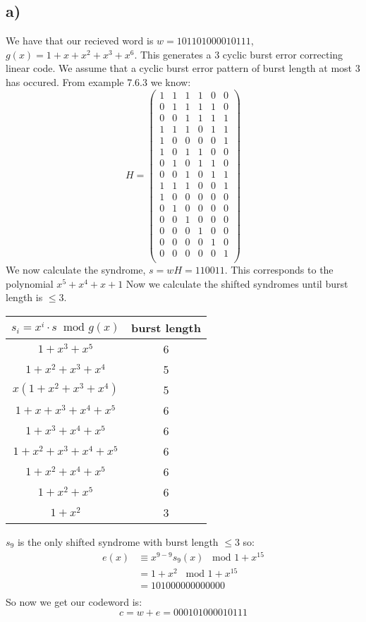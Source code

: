 \documentclass{article}
\begin{document}
\subsection*{a)}
We have that our recieved word is $w=10110 10000 10111$, $g(x)=1+x+x^2+x^3+x^6$. This generates a 3 cyclic burst error correcting linear code. We assume that a cyclic burst error pattern of burst length at most 3 has occured. From example 7.6.3 we know:
$$H =\begin{pmatrix}
1& 1& 1& 1& 0& 0\\
0& 1& 1& 1& 1& 0\\
0& 0& 1& 1& 1& 1\\
1& 1& 1& 0& 1& 1\\
1& 0& 0& 0& 0& 1\\
1& 0& 1& 1& 0& 0\\
0& 1& 0& 1& 1& 0\\
0& 0& 1& 0& 1& 1\\
1& 1& 1& 0& 0& 1\\
1&0&0&0&0&0\\
0&1&0&0&0&0\\
0&0&1&0&0&0\\
0&0&0&1&0&0\\
0&0&0&0&1&0\\
0&0&0&0&0&1\\
\end{pmatrix}$$
We now calculate the syndrome, $s=wH=110011$. This corresponds to the polynomial $x^5+x^4+x+1$ Now we calculate the shifted syndromes until burst length is $\leq3$.
\begin{center}
\begin{tabular}{||c c||} 
 \hline
 $s_i=x^i\cdot s \;\;\text{mod }g(x)$ & burst length\\ [0.5ex] 
 \hline\hline
 $1+x^3+x^5$ & 6\\ 
 \hline
 $1+x^2+x^3+x^4$ & 5\\
 \hline
 $x(1+x^2+x^3+x^4)$ & 5\\
 \hline
 $1+x+x^3+x^4+x^5$ & 6 \\
 \hline
 $1+x^3+x^4+x^5$ & 6\\
 \hline
 $1+x^2+x^3+x^4+x^5$ & 6\\
 \hline
 $1+x^2+x^4+x^5$ & 6\\
 \hline
 $1+x^2+x^5$ & 6\\
 \hline
 $1+x^2$ & 3\\ [1ex] 
 \hline
\end{tabular}
\end{center}
$s_9$ is the only shifted syndrome with burst length $\leq3$ so:
\begin{align*}
e(x)&\equiv x^{9-9}s_9(x)\;\;\;\text{mod }1+x^{15}\\
&=1+x^2\;\;\;\text{mod }1+x^{15}\\
&=101000000000000\\
\end{align*}
So now we get our codeword is:
$$c=w+e=000101000010111$$
\end{document}
